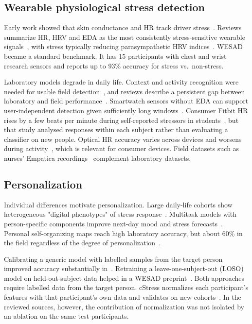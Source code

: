 \documentclass[conference]{IEEEtran}
\begin{document}
\subsection{Wearable physiological stress detection}
Early work showed that skin conductance and HR track driver stress~\cite{healey2005driving}. Reviews summarize HR, HRV and EDA as the most consistently stress-sensitive wearable signals~\cite{giannakakis2022review,schmidt2019review}, with stress typically reducing parasympathetic HRV indices~\cite{kim2018hrv}. WESAD~\cite{schmidt2018wesad} became a standard benchmark. It has 15 participants with chest and wrist research sensors and reports up to 93\% accuracy for stress vs.\ non-stress.

Laboratory models degrade in daily life. Context and activity recognition were needed for usable field detection~\cite{gjoreski2017context}, and reviews describe a persistent gap between laboratory and field performance~\cite{can2019survey}. Smartwatch sensors without EDA can support user-independent detection given sufficiently long windows~\cite{siirtola2019smartwatch}. Consumer Fitbit HR rises by a few beats per minute during self-reported stressors in students~\cite{pakhomov2020fitbit}, but that study analysed responses within each subject rather than evaluating a classifier on new people. Optical HR accuracy varies across devices and worsens during activity~\cite{bent2020optical}, which is relevant for consumer devices. Field datasets such as nurses' Empatica recordings~\cite{hosseini2022nurses} complement laboratory datasets.

\subsection{Personalization}
Individual differences motivate personalization. Large daily-life cohorts show heterogeneous "digital phenotypes" of stress response~\cite{smets2018digital}. Multitask models with person-specific components improve next-day mood and stress forecasts~\cite{taylor2020multitask}. Personal self-organizing maps reach high laboratory accuracy, but about 60\% in the field regardless of the degree of personalization~\cite{tervonen2020som}.

Calibrating a generic model with labelled samples from the target person improved accuracy substantially in~\cite{nkurikiyeyezu2020person}. Retraining a leave-one-subject-out (LOSO) model on held-out-subject data helped in a WESAD preprint~\cite{sah2021personalization}. Both approaches require labelled data from the target person. cStress normalizes each participant's features with that participant's own data and validates on new cohorts~\cite{hovsepian2015cstress}. In the reviewed sources, however, the contribution of normalization was not isolated by an ablation on the same test participants.
\end{document}
